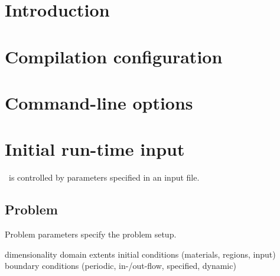 \documentclass{article}
\begin{document}

\section{Introduction} \label{s:intro}





\section{Compilation configuration} \label{s:compile}

\section{Command-line options} \label{s:commandline}

\section{Initial run-time input} \label{s:input}

\cello\ is controlled by parameters specified in an input file.



\subsection{Problem}

Problem parameters specify the problem setup.

  dimensionality
  domain extents
  initial conditions (materials, regions, input)
 boundary conditions (periodic, in-/out-flow, specified, dynamic)
\end{document}
